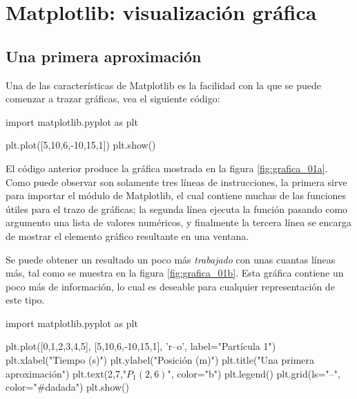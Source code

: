  \chapter{Matplotlib: visualización gráfica}


\section{Una primera aproximación}

Una de las características de Matplotlib es la facilidad con la que se puede 
comenzar a trazar gráficas, vea el siguiente código:

\begin{python}
import matplotlib.pyplot as plt

plt.plot([5,10,6,-10,15,1])
plt.show()
\end{python}

El código anterior produce la gráfica mostrada en la figura \ref{fig:grafica_01a}. Como puede observar son solamente 
tres líneas de instrucciones, la primera sirve para importar el módulo  de Matplotlib, el cual contiene 
muchas de las funciones útiles para el trazo de gráficas; la segunda línea ejecuta la función  pasando como 
argumento una lista de valores numéricos, y finalmente la tercera línea se encarga de mostrar el elemento gráfico 
resultante en una ventana. 

Se puede obtener un resultado un poco más \textit{trabajado} con unas cuantas líneas más, tal como se 
muestra en la figura \ref{fig:grafica_01b}. Esta gráfica contiene un poco más de información, lo cual es 
deseable para cualquier representación de este tipo.

\begin{python}
import matplotlib.pyplot as plt

plt.plot([0,1,2,3,4,5], [5,10,6,-10,15,1], 'r--o', label="Partícula 1")
plt.xlabel("Tiempo (s)")
plt.ylabel("Posición (m)")
plt.title("Una primera aproximación")
plt.text(2,7,"$ P_1 (2,6) $", color="b")
plt.legend()
plt.grid(ls="--", color="#dadada")
plt.show()
\end{python}


